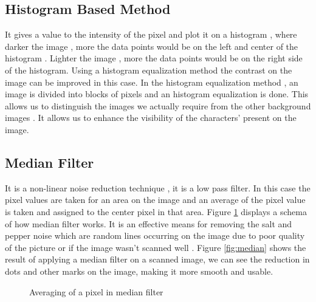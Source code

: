 \documentclass[9pt,twocolumn,twoside]{../../styles/osajnl}
\begin{document}
\subsection{Histogram Based Method}

It gives a value to the intensity of the pixel and plot it on a
histogram , where darker the image , more the data points would be on
the left and center of the histogram . Lighter the image , more the
data points would be on the right side of the histogram. Using a
histogram equalization method the contrast on the image can be
improved in this case. In the histogram equalization method , an image
is divided into blocks of pixels and an histogram equalization is
done.  This allows us to distinguish the images we actually require
from the other background images . It allows us to enhance the
visibility of the characters’ present on the image.

\subsection{Median Filter}
It is a non-linear noise reduction technique , it is a low pass
filter. In this case the pixel values are taken for an area on the
image and an average of the pixel value is taken and assigned to the
center pixel in that area. Figure \ref{fig:median-schema} displays a schema of
how median filter works. It is an effective means for removing the
salt and pepper noise which are random lines occurring on the image
due to poor quality of the picture or if the image wasn’t scanned
well \cite{medianfilterpreprocessing}. Figure \ref{fig:median} shows the result of
applying a median filter on a scanned image, we can see the reduction
in dots and other marks on the image, making it more smooth and
usable.


\begin{figure}[H]
\centering
{}
\caption{Averaging of a pixel in median filter \cite{medianfilterpreprocessing}}
\label{fig:median-schema}
\end{figure}
\end{document}
